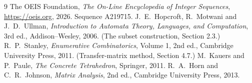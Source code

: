 \documentclass[11pt,a4paper]{article}
\theoremstyle{plain}
\theoremstyle{definition}
\begin{document}
\begin{thebibliography}{9}
 The OEIS Foundation, \emph{The On-Line Encyclopedia of Integer
Sequences}, \url{https://oeis.org}, 2026. Sequence A219715.
 J.~E.~Hopcroft, R.~Motwani and J.~D.~Ullman, \emph{Introduction to Automata
Theory, Languages, and Computation}, 3rd ed., Addison--Wesley, 2006. (The subset
construction, Section 2.3.)
 R.~P.~Stanley, \emph{Enumerative Combinatorics}, Volume 1, 2nd ed.,
Cambridge University Press, 2011. (Transfer-matrix method, Section 4.7.)
 M.~Kauers and P.~Paule, \emph{The Concrete Tetrahedron}, Springer, 2011.
 R.~A.~Horn and C.~R.~Johnson, \emph{Matrix Analysis}, 2nd ed., Cambridge
University Press, 2013.
\end{thebibliography}
\end{document}
